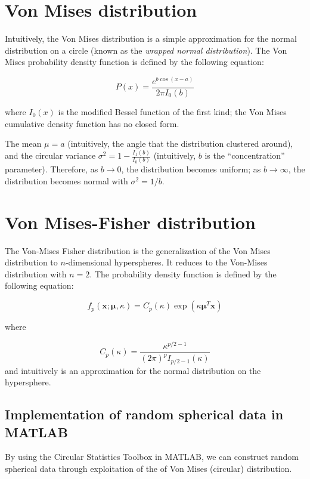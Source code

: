 \documentclass[../tech_report_1.tex]{subfiles}
\begin{document}
\section{Von Mises distribution}

Intuitively, the Von Mises distribution \cite{wolfram_von_mises} is
a simple approximation for the normal distribution on a circle (known
as the \textit{wrapped normal distribution}). The Von Mises probability
density function is defined by the following equation:

\[
P(x)=\frac{{e^{b\cos(x-a)}}}{2\pi I_{0}(b)}
\]


where $I_{0}(x)$ is the modified Bessel function of the first kind;
the Von Mises cumulative density function has no closed form.

The mean $\mu=a$ (intuitively, the angle that the distribution clustered
around), and the circular variance $\sigma^{2}=1-\frac{{I_{1}(b)}}{I_{0}(b)}$
(intuitively, $b$ is the ``concentration'' parameter). Therefore,
as $b\rightarrow0$, the distribution becomes uniform; as $b\rightarrow\infty$,
the distribution becomes normal with $\sigma^{2}=1/b$.


\section{Von Mises-Fisher distribution}

The Von-Mises Fisher distribution is the generalization of the Von
Mises distribution to $n$-dimensional hyperspheres. It reduces to
the Von-Mises distribution with $n=2$. The probability density function
is defined by the following equation:

\[
f_{p}(\boldsymbol{x};\boldsymbol{\mu},\kappa)=C_{p}(\kappa)\exp(\kappa\boldsymbol{\mu}^{T}\boldsymbol{x})
\]


where

\[
C_{p}(\kappa)=\frac{\kappa^{p/2-1}}{(2\pi)^{p}I_{p/2-1}(\kappa)}
\]
 and intuitively is an approximation for the normal distribution on
the hypersphere.

\subsection{Implementation of random spherical data in MATLAB}

By using the Circular Statistics Toolbox in MATLAB, we can construct random spherical data through exploitation of the of Von Mises (circular) distribution.
\end{document}

